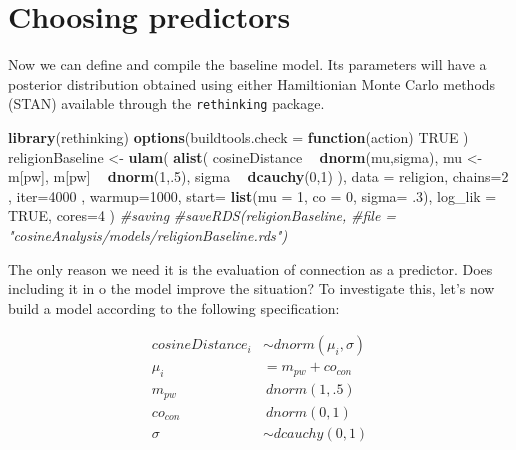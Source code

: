 \documentclass[12pt,]{book}
\newenvironment{Shaded}{\begin{snugshade}}{\end{snugshade}}
\newcommand{\KeywordTok}[1]{\textcolor[rgb]{0.13,0.29,0.53}{\textbf{#1}}}
\newcommand{\DataTypeTok}[1]{\textcolor[rgb]{0.13,0.29,0.53}{#1}}
\newcommand{\DecValTok}[1]{\textcolor[rgb]{0.00,0.00,0.81}{#1}}
\newcommand{\FloatTok}[1]{\textcolor[rgb]{0.00,0.00,0.81}{#1}}
\newcommand{\StringTok}[1]{\textcolor[rgb]{0.31,0.60,0.02}{#1}}
\newcommand{\CommentTok}[1]{\textcolor[rgb]{0.56,0.35,0.01}{\textit{#1}}}
\newcommand{\OtherTok}[1]{\textcolor[rgb]{0.56,0.35,0.01}{#1}}
\newcommand{\ControlFlowTok}[1]{\textcolor[rgb]{0.13,0.29,0.53}{\textbf{#1}}}
\newcommand{\OperatorTok}[1]{\textcolor[rgb]{0.81,0.36,0.00}{\textbf{#1}}}
\newcommand{\NormalTok}[1]{#1}
\begin{document}
\section{Choosing predictors}\label{choosing-predictors}

Now we can define and compile the baseline model. Its parameters will
have a posterior distribution obtained using either Hamiltionian Monte
Carlo methods (STAN) available through the \texttt{rethinking} package.

\vspace{1mm} \footnotesize

\begin{Shaded}
\begin{Highlighting}[]
\KeywordTok{library}\NormalTok{(rethinking)}
\KeywordTok{options}\NormalTok{(}\DataTypeTok{buildtools.check =} \ControlFlowTok{function}\NormalTok{(action) }\OtherTok{TRUE}\NormalTok{ )}
\NormalTok{religionBaseline <-}\StringTok{ }\KeywordTok{ulam}\NormalTok{(}
  \KeywordTok{alist}\NormalTok{(}
\NormalTok{    cosineDistance }\OperatorTok{~}\StringTok{ }\KeywordTok{dnorm}\NormalTok{(mu,sigma),}
\NormalTok{    mu <-}\StringTok{ }\NormalTok{m[pw],}
\NormalTok{    m[pw] }\OperatorTok{~}\StringTok{ }\KeywordTok{dnorm}\NormalTok{(}\DecValTok{1}\NormalTok{,.}\DecValTok{5}\NormalTok{),}
\NormalTok{    sigma }\OperatorTok{~}\StringTok{ }\KeywordTok{dcauchy}\NormalTok{(}\DecValTok{0}\NormalTok{,}\DecValTok{1}\NormalTok{)}
\NormalTok{  ),}
  \DataTypeTok{data =}\NormalTok{ religion,}
  \DataTypeTok{chains=}\DecValTok{2}\NormalTok{ , }\DataTypeTok{iter=}\DecValTok{4000}\NormalTok{ , }\DataTypeTok{warmup=}\DecValTok{1000}\NormalTok{,}
  \DataTypeTok{start=} \KeywordTok{list}\NormalTok{(}\DataTypeTok{mu =} \DecValTok{1}\NormalTok{, }\DataTypeTok{co =} \DecValTok{0}\NormalTok{, }\DataTypeTok{sigma=} \FloatTok{.3}\NormalTok{),}
  \DataTypeTok{log_lik =} \OtherTok{TRUE}\NormalTok{, }\DataTypeTok{cores=}\DecValTok{4}
\NormalTok{)}
\CommentTok{#saving}
\CommentTok{#saveRDS(religionBaseline, }
\CommentTok{#file = "cosineAnalysis/models/religionBaseline.rds")}
\end{Highlighting}
\end{Shaded}

The only reason we need it is the evaluation of connection as a
predictor. Does including it in o the model improve the situation? To
investigate this, let's now build a model according to the following
specification:

\begin{align}
cosineDistance_i  & \sim dnorm(\mu_i, \sigma) \\
\mu_i & = m_{pw} + co_{con}\\
m_{pw} & ~ dnorm(1,.5) \\
co_{con} & ~ dnorm(0,1) \\
\sigma &\sim  dcauchy(0,1)
\end{align}
\end{document}
